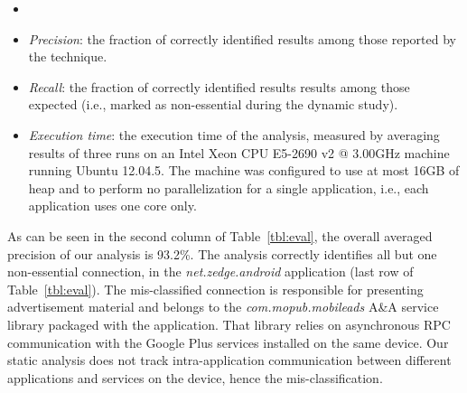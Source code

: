 \begin{itemize}[leftmargin=0.5cm]%
\item
\item
\emph{Precision}: the fraction of correctly identified results among those reported by the technique.
\item
\emph{Recall}: the fraction of correctly identified results results among those expected (i.e., marked as non-essential during the dynamic study). 
\item \emph{Execution time}: the execution time of the analysis, measured by averaging results of
three runs on an Intel\textsuperscript{\textregistered} Xeon\textsuperscript{\textregistered} CPU E5-2690 v2 @ 3.00GHz machine running Ubuntu 12.04.5. The machine was configured to use at most 16GB of heap and to perform no parallelization for a single application, i.e., each application uses one core only.
\end{itemize}
  
As can be seen in the second column of Table~\ref{tbl:eval}, the overall averaged precision of our analysis is 93.2\%. 
The analysis correctly identifies all but one non-essential connection, in the \emph{net.zedge.android} application (last row of Table~\ref{tbl:eval}).  
The mis-classified connection is responsible for presenting advertisement material and belongs to the \emph{com.mopub.mobileads} A\&A service library packaged with the application. 
That library relies on asynchronous RPC communication with the Google Plus services 
installed on the same device. Our static analysis does not track intra-application communication between different applications and services on the device, hence the mis-classification.   
 
